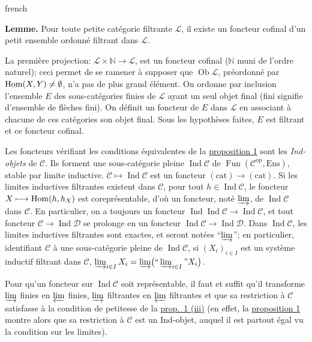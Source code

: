 \begin{hyphenrules}{french}
\par\medskip\noindent\textbf{Lemme.} Pour toute petite cat\'egorie filtrante $\mathcal{L}$, il existe un foncteur cofinal d'un petit ensemble ordonn\'e filtrant dans $\mathcal{L}$.

La premi\`ere projection: $\mathcal{L} \times \mathbb{N} \longrightarrow \mathcal{L}$, est un foncteur cofinal ($\mathbb{N}$ muni de l'ordre naturel); ceci permet de se ramener \`a supposer que $\operatorname{Ob}\mathcal{L}$, pr\'eordonn\'e par $\operatorname{Hom}(X,Y) \neq \emptyset$, n'a pas de plus grand \'el\'ement. On ordonne par inclusion l'ensemble $E$ des sous-cat\'egories finies de $\mathcal{L}$ ayant un seul objet final (fini signifie d'ensemble de fl\`eches fini). On d\'efinit un foncteur de $E$ dans $\mathcal{L}$ en associant \`a chacune de ces cat\'egories son objet final. Sous les hypoth\`eses faites, $E$ est filtrant et ce foncteur cofinal.

Les foncteurs v\'erifiant les conditions \'equivalentes de la \hyperref[app:prop1]{proposition 1} sont les \emph{Ind-objets} de $\mathcal{C}$. Ils forment une sous-cat\'egorie pleine $\operatorname{Ind}\mathcal{C}$ de $\operatorname{Fun}(\mathcal C^{\mathrm{op}},\mathrm{Ens})$, stable par limite inductive. $\mathcal{C} \longmapsto \operatorname{Ind}\mathcal{C}$ est un foncteur $(\text{cat}) \to (\text{cat})$. Si les limites inductives filtrantes existent dans $\mathcal{C}$, pour tout $h \in \operatorname{Ind}\mathcal{C}$, le foncteur $X\longmapsto\operatorname{Hom}(h,h_X)$ est corepr\'esentable, d'o\`u un foncteur, not\'e $\varinjlim$, de $\operatorname{Ind}\mathcal{C}$ dans $\mathcal{C}$. En particulier, on a toujours un foncteur $\operatorname{Ind}\operatorname{Ind}\mathcal{C} \longrightarrow \operatorname{Ind}\mathcal{C}$, et tout foncteur $\mathcal C\longrightarrow\operatorname{Ind}\mathcal D$ se prolonge en un foncteur $\operatorname{Ind}\mathcal C\longrightarrow\operatorname{Ind}\mathcal D$. Dans $\operatorname{Ind}\mathcal{C}$, les limites inductives filtrantes sont exactes, et seront not\'ees ``$\varinjlim$''; en particulier, identifiant $\mathcal{C}$ \`a une sous-cat\'egorie pleine de $\operatorname{Ind}\mathcal{C}$, si $(X_i)_{i \in I}$ est un syst\`eme inductif filtrant dans $\mathcal{C}$, $\varinjlim_{i\in I}X_i=\varinjlim\bigl(\text{``}\varinjlim_{i\in I}\text{''}X_i\bigr)$.

Pour qu'un foncteur sur $\operatorname{Ind}\mathcal{C}$ soit repr\'esentable, il faut et suffit qu'il transforme $\varinjlim$ finies en $\varprojlim$ finies, $\varinjlim$ filtrantes en $\varprojlim$ filtrantes et que sa restriction \`a $\mathcal{C}$ satisfasse \`a la condition de petitesse de la \hyperref[app:prop1]{prop.\ 1 (iii)} (en effet, la \hyperref[app:prop1]{proposition 1} montre alors que sa restriction \`a $\mathcal{C}$ est un Ind-objet, auquel il est partout \'egal vu la condition sur les limites).


\end{hyphenrules}
